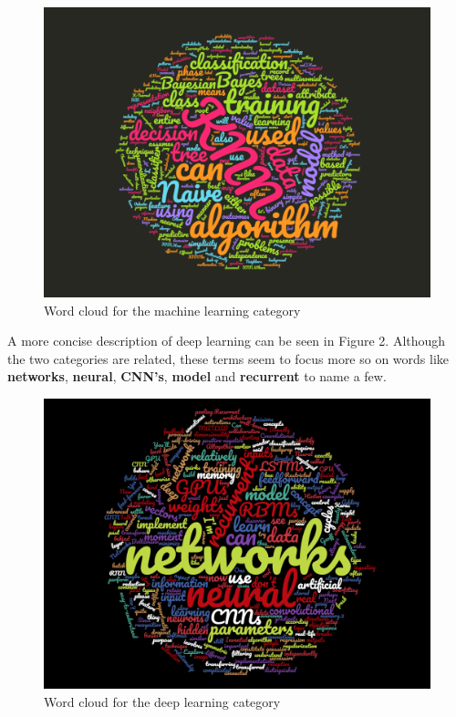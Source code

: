 \begin{figure}[ht]
	\begin{center}
		\advance\leftskip-3cm
		\advance\rightskip-3cm
		\includegraphics[keepaspectratio=true,scale=0.4]{__resources/machine_learning.png}
		\caption{Word cloud for the machine learning category}
		\label{mlfig}
	\end{center}
\end{figure}

\newpage

A more concise description of deep learning can be seen in Figure 2. Although the two categories are related, these terms seem to focus more so on words like \textbf{networks}, \textbf{neural}, \textbf{CNN's}, \textbf{model} and \textbf{recurrent} to name a few.

\begin{figure}[ht]
	\begin{center}
		\advance\leftskip-3cm
		\advance\rightskip-3cm
		\includegraphics[keepaspectratio=true,scale=0.4]{__resources/deep_learning.png}
		\caption{Word cloud for the deep learning category}
		\label{dlfig}
	\end{center}
\end{figure}

